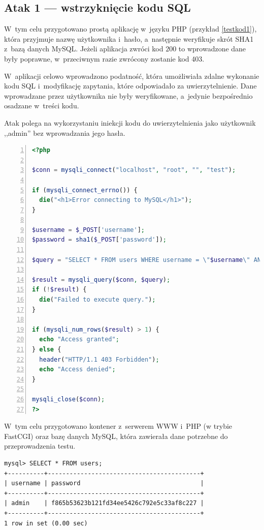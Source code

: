 \documentclass[12pt,a4paper,polish,thesis]{dcsbook}
\begin{document}
\subsection*{Atak 1 --- wstrzyknięcie kodu SQL}
 W~tym celu przygotowano prostą aplikację w~języku PHP (przykład \ref{testkod1}), która przyjmuje nazwę użytkownika i~hasło, a~następnie weryfikuje skrót SHA1 z~bazą danych MySQL. Jeżeli aplikacja zwróci kod $200$ to wprowadzone dane były poprawne, w~przeciwnym razie zwrócony zostanie kod 403.

 W~aplikacji celowo wprowadzono podatność, która umożliwiała zdalne wykonanie kodu SQL i~modyfikację zapytania, które odpowiadało za uwierzytelnienie. Dane wprowadzane przez użytkownika nie były weryfikowane, a~jedynie bezpośrednio osadzane w~treści kodu.

Atak polega na wykorzystaniu iniekcji kodu do uwierzytelnienia jako użytkownik ,,admin'' bez wprowadzania jego hasła.

\begin{lstlisting}[language=PHP,frame=single,label=testkod1,numbers=left,caption=kod aplikacji przygotowanej na potrzeby testów]
<?php

$conn = mysqli_connect("localhost", "root", "", "test");

if (mysqli_connect_errno()) {
  die("<h1>Error connecting to MySQL</h1>");
}

$username = $_POST['username'];
$password = sha1($_POST['password']);

$query = "SELECT * FROM users WHERE username = \"$username\" AND password = \"$password\"";

$result = mysqli_query($conn, $query);
if (!$result) {
  die("Failed to execute query.");
}

if (mysqli_num_rows($result) > 1) {
  echo "Access granted";
} else {
  header("HTTP/1.1 403 Forbidden");
  echo "Access denied";
}

mysqli_close($conn);
?>
\end{lstlisting}

 W~tym celu przygotowano kontener z~serwerem WWW i~PHP (w trybie FastCGI) oraz bazę danych MySQL, która zawierała dane potrzebne do przeprowadzenia testu.

\begin{lstlisting}[frame=single,caption=zawartość testowej bazy danych]
mysql> SELECT * FROM users;
+----------+------------------------------------------+
| username | password                                 |
+----------+------------------------------------------+
| admin    | f865b53623b121fd34ee5426c792e5c33af8c227 |
+----------+------------------------------------------+
1 row in set (0.00 sec)
\end{lstlisting}
\end{document}
